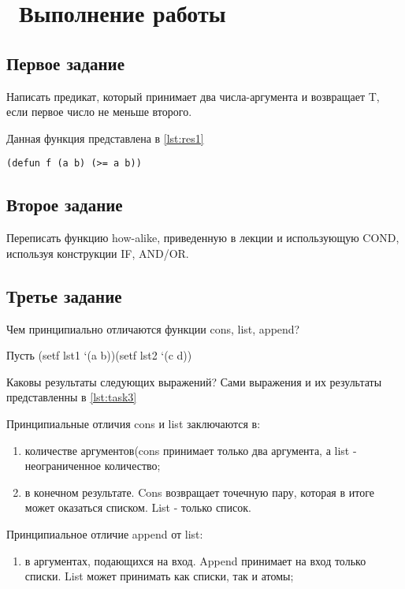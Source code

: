 \chapter{ Выполнение работы}
\label{cha:analysis}

\section{ Первое задание}

Написать предикат, который принимает два числа-аргумента и возвращает T, если первое число не меньше второго.

Данная функция представлена в \ref{lst:res1}

\begin{lstlisting}[style=lispStyle, caption={ Предикат, который проводит сравнение чисел a и b.},
                    label={lst:res1}]
(defun f (a b) (>= a b))
\end{lstlisting}

\section{ Второе задание}

Переписать функцию how-alike, приведенную в лекции и использующую COND, используя конструкции IF, AND/OR.

\section{ Третье задание}

Чем принципиально отличаются функции cons, list, append?

Пусть (setf lst1 `(a b))(setf lst2 `(c d))

Каковы результаты следующих выражений? Сами выражения и их результаты представленны в \ref{lst:task3}

Принципиальные отличия cons и list заключаются в:
\begin{enumerate}
    \item количестве аргументов(cons принимает только два аргумента, а list - неограниченное количество;
    \item в конечном результате. Cons возвращает точечную пару, которая в итоге может оказаться списком. List - только список.
\end{enumerate}

Принципиальное отличие append от list:
\begin{enumerate}
    \item в аргументах, подающихся на вход. Append принимает на вход только списки. List может принимать как списки, так и атомы;
\end{enumerate}


